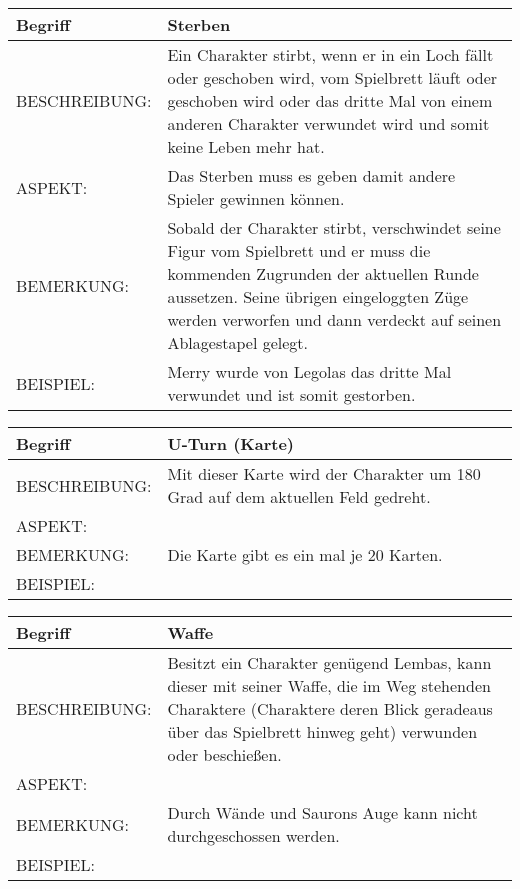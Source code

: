 \documentclass{uulm-assignment}
\begin{document}
	     \begin{tabularx}{\textwidth}{|l|X |} \hline
	        \textbf{Begriff} & \textbf{Sterben} \\
	        \hline
	        BESCHREIBUNG: &  Ein Charakter stirbt, wenn er in ein Loch fällt oder geschoben wird, vom Spielbrett läuft oder geschoben wird oder das dritte Mal von einem anderen Charakter verwundet wird und somit keine Leben mehr hat. \\
	        \hline
	        ASPEKT: & Das Sterben muss es geben damit andere Spieler gewinnen können.
	        \\
	        \hline
	        BEMERKUNG: & Sobald der Charakter stirbt, verschwindet seine Figur vom Spielbrett und er muss die kommenden Zugrunden der aktuellen Runde aussetzen. Seine übrigen eingeloggten Züge werden verworfen und dann verdeckt auf seinen Ablagestapel gelegt. \\
	        \hline
	        BEISPIEL: & Merry wurde von Legolas das dritte Mal verwundet und ist somit gestorben.\\
	        \hline
	    \end{tabularx}

	     \begin{tabularx}{\textwidth}{|l|X |} \hline
	        \textbf{Begriff} & \textbf{U-Turn (Karte)} \\
	        \hline
	        BESCHREIBUNG: & Mit dieser Karte wird der Charakter um 180 Grad auf dem aktuellen Feld gedreht.  \\
	        \hline
	        ASPEKT: & 
	        \\
	        \hline
	        BEMERKUNG: & Die Karte gibt es ein mal je 20 Karten. \\
	        \hline
	        BEISPIEL: & \\
	        \hline
	    \end{tabularx}

	     \begin{tabularx}{\textwidth}{|l|X |} \hline
	        \textbf{Begriff} & \textbf{Waffe} \\
	        \hline
	        BESCHREIBUNG: &  Besitzt ein Charakter genügend Lembas, kann dieser mit seiner Waffe, die im Weg stehenden Charaktere (Charaktere deren Blick geradeaus über das Spielbrett hinweg geht) verwunden oder beschießen.  \\
	        \hline
	        ASPEKT: & 
	        \\
	        \hline
	        BEMERKUNG: & Durch Wände und Saurons Auge kann nicht durchgeschossen werden. \\
	        \hline
	        BEISPIEL: & \\
	        \hline
	    \end{tabularx}
\end{document}

